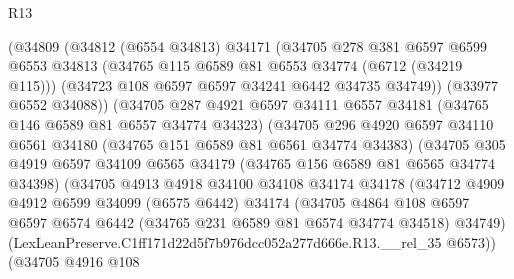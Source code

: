 \begin{lexlean}{R13}
\begin{coremodule}
                    (@34809
                      (@34812
                        (@6554 @34813)
                        @34171
                        (@34705
                          @278
                          @381
                          @6597
                          @6599
                          @6553
                          @34813
                          (@34765 @115 @6589 @81 @6553 @34774 (@6712 (@34219 @115)))
                          (@34723 @108 @6597 @6597 @34241 @6442 @34735 @34749))
                        (@33977 @6552 @34088))
                      (@34705
                        @287
                        @4921
                        @6597
                        @34111
                        @6557
                        @34181
                        (@34765 @146 @6589 @81 @6557 @34774 @34323)
                        (@34705
                          @296
                          @4920
                          @6597
                          @34110
                          @6561
                          @34180
                          (@34765 @151 @6589 @81 @6561 @34774 @34383)
                          (@34705
                            @305
                            @4919
                            @6597
                            @34109
                            @6565
                            @34179
                            (@34765 @156 @6589 @81 @6565 @34774 @34398)
                            (@34705
                              @4913
                              @4918
                              @34100
                              @34108
                              @34174
                              @34178
                              (@34712
                                @4909
                                @4912
                                @6599
                                @34099
                                (@6575 @6442)
                                @34174
                                (@34705
                                  @4864
                                  @108
                                  @6597
                                  @6597
                                  @6574
                                  @6442
                                  (@34765 @231 @6589 @81 @6574 @34774 @34518)
                                  @34749)
                                (LexLeanPreserve.C1ff171d22d5f7b976dcc052a277d666e.R13.__rel_35
                                  @6573))
                              (@34705
                                @4916
                                @108

\end{coremodule}
\end{lexlean}
